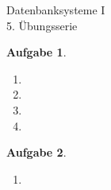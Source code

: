 \documentclass[11pt]{article}
\theoremstyle{break}
\newtheorem{task}{Aufgabe}
\begin{document}
\begin{center}
\Large{Datenbanksysteme I}\\
\large{5. Übungsserie}
\end{center}
\begin{task}
    \hfill\vspace{-5mm}
    \begin{enumerate}[label={(\alph*)}]
        \item \hfill
        \item \hfill
        \item \hfill
        \newpage
        \item \hfill
    \end{enumerate}
\end{task}
\begin{task}
    \hfill\vspace{-5mm}
    \begin{enumerate}[label={(\alph*)}]
        \item \hfill
    \end{enumerate}
\end{task}
\end{document}
